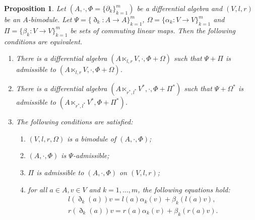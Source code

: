 \documentclass[pdftex]{sigma}
\numberwithin{equation}{section}
\newtheorem{Proposition}[Theorem]{Proposition}
{ \theoremstyle{definition}
	\newtheorem{Definition}[Theorem]{Definition}
	\newtheorem{Note}[Theorem]{Note}
	\newtheorem{Example}[Theorem]{Example}
	\newtheorem{Remark}[Theorem]{Remark} }
\begin{document}
\begin{Proposition}\label{pro:admsemi}
 Let $(A, \cdot, \Phi = \{\partial_k\}_{k=1}^m)$ be a differential algebra and
 $(V, l, r)$ be an $A$-bimodule.
 Let $\Psi = \{\eth_k\colon A \to A \}_{k=1}^m$, $\Omega = \{\alpha_k\colon V \to V\}_{k=1}^m$ and
 $\Pi = \{\beta_k\colon V \to V\}_{k=1}^m$ be sets of commuting linear maps.
 Then the following conditions are equivalent.
 \begin{enumerate}\itemsep=0pt
 \item[$1.$] There is a differential algebra $(A \ltimes_{l,r} V, \cdot, \Phi + \Omega)$ such that $\Psi + \Pi$ is admissible to $(A \ltimes_{l,r} V, \cdot, \Phi + \Omega)$.

 \item[$2.$] There is a differential algebra $(A \ltimes_{r^*, l^*} V^*, \cdot, \Phi + \Pi^*)$ such that $\Psi + \Omega^*$ is admissible to $(A \ltimes_{r^*,l^*} V^*, \Phi + \Pi^*)$.

 \item[$3.$] The following conditions are satisfied:
 \begin{enumerate}\itemsep=0pt
 \item[$(i)$] $(V, l, r, \Omega)$ is a bimodule of $(A, \cdot, \Phi)$;
 \item[$(ii)$] $(A, \cdot, \Phi)$ is $\Psi$-admissible;
 \item[$(iii)$] $\Pi$ is admissible to $(A, \cdot, \Phi)$ on $(V, l, r)$;
 \item[$(iv)$] for all $a \in A, v \in V$ and $k=1, \dots, m$, the following equations hold:
 \begin{gather}
 l(\eth_k(a))v = l(a) \alpha_k(v) + \beta_k( l(a)v ), \label{eq:admsemi1} \\
 r(\eth_k(a))v = r(a) \alpha_k(v) + \beta_k( r(a)v ). \label{eq:admsemi2}
 \end{gather}
 \end{enumerate}
 \end{enumerate}
\end{Proposition}
\end{document}
